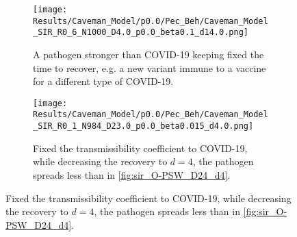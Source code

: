 \documentclass[a4paper,10pt,twoside]{book} %
\theoremstyle{definition}
\begin{document}
\begin{figure}[htbp]
	\centering
	\begin{subfigure}{0.8\linewidth}
		\texttt{[image: Results/Caveman\_Model/p0.0/Pec\_Beh/Caveman\_Model\_SIR\_R0\_6\_N1000\_D4.0\_p0.0\_beta0.1\_d14.0.png]}
		\caption{A pathogen stronger than COVID-19 keeping fixed the time to recover, e.g. a new variant immune to a vaccine for a different type of COVID-19.}
		\label{fig:sir_CM_D4_OR1_d14_b0.1}
	\end{subfigure}
	\par\bigskip
	\centering
	\begin{subfigure}{0.8\linewidth}
		\texttt{[image: Results/Caveman\_Model/p0.0/Pec\_Beh/Caveman\_Model\_SIR\_R0\_1\_N984\_D23.0\_p0.0\_beta0.015\_d4.0.png]}
		\caption{Fixed the transmissibility coefficient to COVID-19, while decreasing the recovery to $d = 4$, the pathogen spreads less than in \autoref{fig:sir_O-PSW_D24_d4}.}
		\label{fig:sir_CM_D23_d4}
	\end{subfigure}
\end{figure}

\clearpage
\end{document}
